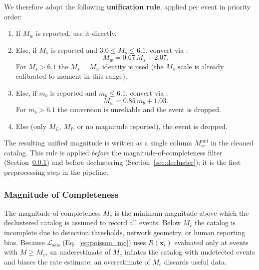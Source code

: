 \documentclass[11pt, a4paper]{article}
\begin{document}
We therefore adopt the following \textbf{unification rule}, applied per event in priority order:
\begin{enumerate}
    \item If $M_w$ is reported, use it directly.
    \item Else, if $M_s$ is reported and $3.0 \le M_s \le 6.1$, convert via \cite{Scordilis2006}:
          \begin{equation}
              M_w = 0.67\,M_s + 2.07.
              \label{eq:ms_to_mw}
          \end{equation}
          For $M_s > 6.1$ the $M_s = M_w$ identity is used (the $M_s$ scale is already calibrated to moment in this range).
    \item Else, if $m_b$ is reported and $m_b \le 6.1$, convert via \cite{Scordilis2006}:
          \begin{equation}
              M_w = 0.85\,m_b + 1.03.
              \label{eq:mb_to_mw}
          \end{equation}
          For $m_b > 6.1$ the conversion is unreliable and the event is dropped.
    \item Else (only $M_L$, $M_I$, or no magnitude reported), the event is dropped.
\end{enumerate}
The resulting unified magnitude is written as a single column $M_w^{\text{uni}}$ in the cleaned catalog. This rule is applied \emph{before} the magnitude-of-completeness filter (Section~\ref{sec:mc_est}) and before declustering (Section~\ref{sec:decluster}); it is the first preprocessing step in the pipeline.

\subsubsection{Magnitude of Completeness}
\label{sec:mc_est}
The magnitude of completeness $M_c$ is the minimum magnitude above which the declustered catalog is assumed to record all events. Below $M_c$ the catalog is incomplete due to detection thresholds, network geometry, or human reporting bias. Because $\mathcal{L}_{\text{seis}}$ (Eq.~\ref{eq:poisson_mc}) uses $R(\mathbf{x}_i)$ evaluated only at events with $M \ge M_c$, an underestimate of $M_c$ inflates the catalog with undetected events and biases the rate estimate; an overestimate of $M_c$ discards useful data.
\end{document}
